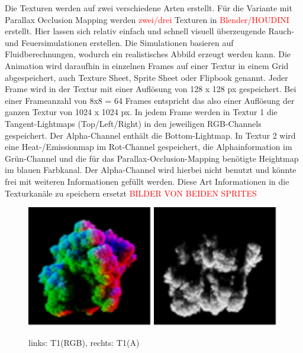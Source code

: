 Die Texturen werden auf zwei verschiedene Arten erstellt. Für die Variante mit Parallax Occlusion Mapping werden \textcolor{red}{zwei/drei}
Texturen in \textcolor{red}{Blender/HOUDINI} erstellt. Hier lassen sich relativ einfach und schnell visuell überzeugende Rauch- und
Feuersimulationen erstellen. Die Simulationen basieren auf Fluidberechnungen, wodurch ein realistisches Abbild erzeugt werden kann.
Die Animation wird daraufhin in einzelnen Frames auf einer Textur in einem Grid abgespeichert, auch Texture Sheet, Sprite Sheet oder Flipbook genannt.
Jeder Frame wird in der Textur mit einer Auflösung von 128 x 128 px gespeichert. Bei einer Frameanzahl von 8x8 = 64 Frames entspricht das also
einer Auflösung der ganzen Textur von 1024 x 1024 px.
In jedem Frame werden in Textur 1 die Tangent-Lightmaps (Top/Left/Right) in den jeweiligen RGB-Channels gespeichert.
Der Alpha-Channel enthält die Bottom-Lightmap. In Textur 2 wird eine Heat-/Emissionmap im Rot-Channel gespeichert, die Alphainformation im
Grün-Channel und die für das Parallax-Occlusion-Mapping benötigte Heightmap im blauen Farbkanal. Der Alpha-Channel wird hierbei nicht benutzt und könnte frei mit weiteren 
Informationen gefüllt werden. Diese Art Informationen in die Texturkanäle zu speichern ersetzt 
\textcolor{red}{BILDER VON BEIDEN SPRITES}

\begin{figure}[h]
	\centering
	\includegraphics[width=0.49\textwidth]{Grafiken/Implementation/T1_RGB.png}
	\includegraphics[width=0.49\textwidth]{Grafiken/Implementation/T1_A.png}
	\begin{footnotesize}
		\caption{links: T1(RGB), rechts: T1(A)}
	\end{footnotesize}
\end{figure}


